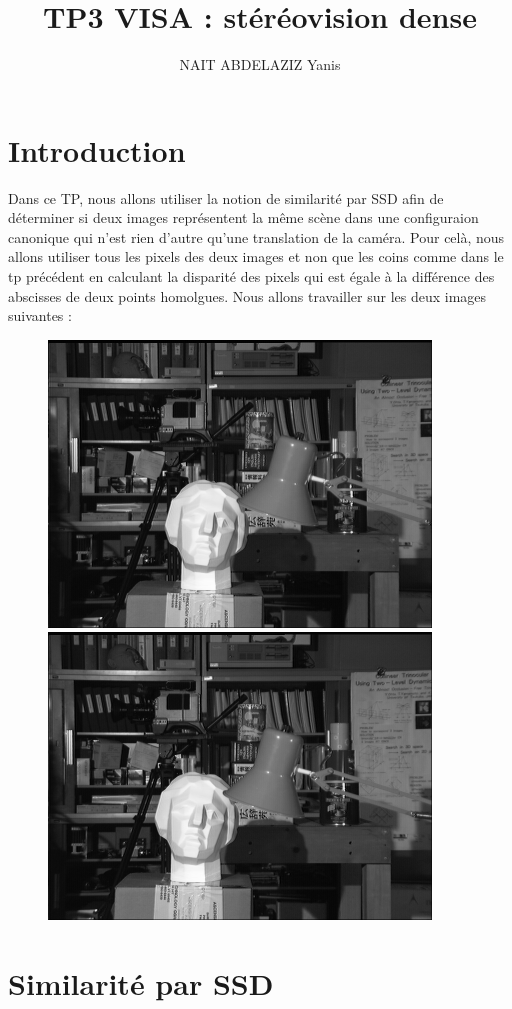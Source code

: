 \documentclass[a4paper,12pt]{report}
\title{TP3 VISA : stéréovision dense}
\author{NAIT ABDELAZIZ Yanis}
\begin{document}
\maketitle
\section*{Introduction}
Dans ce TP, nous allons utiliser la notion de similarité par SSD afin de déterminer si deux images représentent la même scène dans une configuraion canonique qui n'est rien d'autre qu'une translation de la caméra. Pour celà, nous allons utiliser tous les pixels des deux images et non que les coins comme dans le tp précédent en calculant la disparité des pixels qui est égale à la différence des abscisses de deux points homolgues. Nous allons travailler sur les deux images suivantes :
\begin{figure}[!ht]
	\center \includegraphics[scale=0.5]{./image/left.png}
			\includegraphics[scale=0.5]{./image/right.png}
\end{figure}

\section*{Similarité par SSD}
\end{document}
